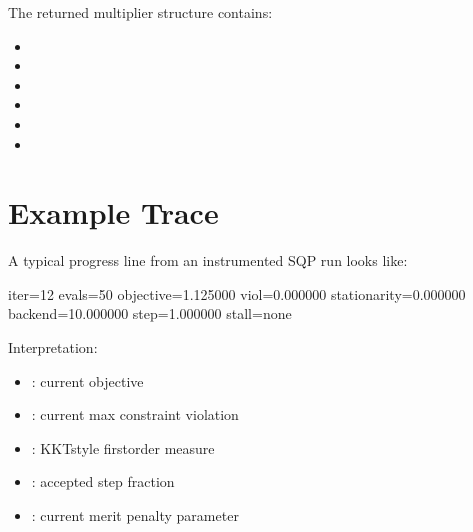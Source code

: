 \documentclass[letterpaper,10pt,english]{sphinxmanual}
\begin{document}
\sphinxAtStartPar
The returned multiplier structure contains:
\begin{itemize}
\item {} 
\sphinxAtStartPar
{}

\item {} 
\sphinxAtStartPar
{}

\item {} 
\sphinxAtStartPar
{}

\item {} 
\sphinxAtStartPar
{}

\item {} 
\sphinxAtStartPar
{}

\item {} 
\sphinxAtStartPar
{}

\end{itemize}


\section{Example Trace}
\label{\detokenize{optima_sequential_qp:example-trace}}
\sphinxAtStartPar
A typical progress line from an instrumented SQP run looks like:

\begin{sphinxVerbatim}[commandchars=\\\{\}]
iter=12 evals=50 objective=1.125000 viol=0.000000 stationarity=0.000000 backend=10.000000 step=1.000000 stall=none
\end{sphinxVerbatim}

\sphinxAtStartPar
Interpretation:
\begin{itemize}
\item {} 
\sphinxAtStartPar
{}: current objective

\item {} 
\sphinxAtStartPar
{}: current max constraint violation

\item {} 
\sphinxAtStartPar
{}: KKT\sphinxhyphen{}style first\sphinxhyphen{}order measure

\item {} 
\sphinxAtStartPar
{}: accepted step fraction

\item {} 
\sphinxAtStartPar
{}: current merit penalty parameter

\end{itemize}
\end{document}
